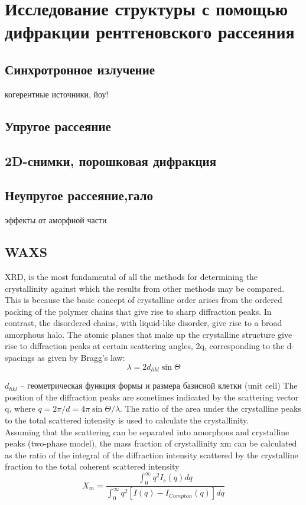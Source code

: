 \section{Исследование структуры с помощью дифракции рентгеновского рассеяния}

\subsection{Синхротронное излучение}
когерентные источники, йоу!
\subsection{Упругое рассеяние}
\subsection{2D-снимки, порошковая дифракция}
\subsection{Неупругое рассеяние,гало}
эффекты от аморфной части
\subsection{WAXS}
XRD, is the most fundamental of all
the methods for determining the crystallinity against which the results from
other methods may be compared.\\
This is because the basic concept of crystalline
order arises from the ordered packing of the polymer chains that give rise to sharp
diffraction peaks. In contrast, the disordered chains, with liquid-like disorder, give
rise to a broad amorphous halo. The atomic planes that make up the crystalline
structure give rise to diffraction peaks at certain scattering angles, 2q, corresponding
to the d-spacings as given by Bragg’s law:
\[
\lambda = 2d_{hkl} \sin \Theta
\]

$d_{hkl}$ -- геометрическая функция формы и размера базисной клетки (unit cell)
The position of the diffraction peaks are sometimes indicated by the scattering vector q, where $q = 2\pi/d = 4\pi \sin \Theta / \lambda$. The ratio of the area under the crystalline peaks
to the total scattered intensity is used to calculate the crystallinity.\\
Assuming that the scattering can be separated into amorphous and crystalline
peaks (two-phase model), the mass fraction of crystallinity xm can be calculated
as the ratio of the integral of the diffraction intensity scattered by the crystalline fraction
to the total coherent scattered intensity
\[
X_m = \frac{\int_0^{\infty} q^2 I_c(q) dq}{\int_0^{\infty} q^2 [I(q) - I_{Compton}(q)] dq}
\]

